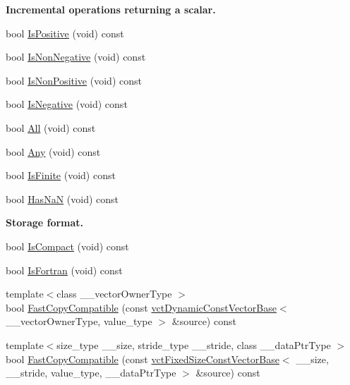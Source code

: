\begin{Indent}{\bf Incremental operations returning a scalar.}
\begin{DoxyCompactItemize}
bool \hyperlink{classvct_dynamic_const_vector_base_afa738d3b70fab6576658c2d0b3399d76}{Is\-Positive} (void) const 
\item 
bool \hyperlink{classvct_dynamic_const_vector_base_ad3c77dc05ac42f1883dece974b0804b8}{Is\-Non\-Negative} (void) const 
\item 
bool \hyperlink{classvct_dynamic_const_vector_base_abbd8304a5570206280556783ed38491d}{Is\-Non\-Positive} (void) const 
\item 
bool \hyperlink{classvct_dynamic_const_vector_base_acf1de24b4e0a6de2a657b6a2293626a2}{Is\-Negative} (void) const 
\item 
bool \hyperlink{classvct_dynamic_const_vector_base_aca94793f67d96dd7faa5edb2476421c0}{All} (void) const 
\item 
bool \hyperlink{classvct_dynamic_const_vector_base_adcad9762e1574b3933f1a794ed67dcc3}{Any} (void) const 
\item 
bool \hyperlink{classvct_dynamic_const_vector_base_a2f013300bb42f8a0ed5c4e16d65d0e40}{Is\-Finite} (void) const 
\item 
bool \hyperlink{classvct_dynamic_const_vector_base_aa84128d614ab37d0fd9aa170a7980caa}{Has\-Na\-N} (void) const 
\end{DoxyCompactItemize}
\end{Indent}
\begin{Indent}{\bf Storage format.}\par
\begin{DoxyCompactItemize}
\item 
bool \hyperlink{classvct_dynamic_const_vector_base_adf8220a267124aebd67b2e2ff5dab9f1}{Is\-Compact} (void) const 
\item 
bool \hyperlink{classvct_dynamic_const_vector_base_a8cb2126c611a87542570c21d3fd10d56}{Is\-Fortran} (void) const 
\item 
{\footnotesize template$<$class \-\_\-\-\_\-vector\-Owner\-Type $>$ }\\bool \hyperlink{classvct_dynamic_const_vector_base_ae0593e26d75b25fbbb3d3405e08da405}{Fast\-Copy\-Compatible} (const \hyperlink{classvct_dynamic_const_vector_base}{vct\-Dynamic\-Const\-Vector\-Base}$<$ \-\_\-\-\_\-vector\-Owner\-Type, value\-\_\-type $>$ \&source) const 
\item 
{\footnotesize template$<$size\-\_\-type \-\_\-\-\_\-size, stride\-\_\-type \-\_\-\-\_\-stride, class \-\_\-\-\_\-data\-Ptr\-Type $>$ }\\bool \hyperlink{classvct_dynamic_const_vector_base_a1059821a74cb7870a831d858deff11d3}{Fast\-Copy\-Compatible} (const \hyperlink{classvct_fixed_size_const_vector_base}{vct\-Fixed\-Size\-Const\-Vector\-Base}$<$ \-\_\-\-\_\-size, \-\_\-\-\_\-stride, value\-\_\-type, \-\_\-\-\_\-data\-Ptr\-Type $>$ \&source) const 
\end{DoxyCompactItemize}
\end{Indent}
